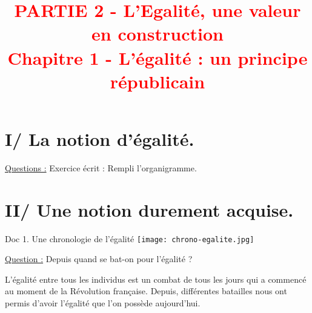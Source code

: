 \documentclass{beamer}
\title{{\textcolor{red}{PARTIE 2 - L'Egalité, une valeur en construction \\ Chapitre 1 - L'égalité : un principe républicain}}}
\begin{document}
 \begin{frame}
  \titlepage %
  \end{frame}
  
  \begin{frame}
  \tableofcontents
  \end{frame}
       
 
 
 
 
 
 \section{I/ La notion d'égalité.}
 
 \begin{frame}
 \underline{Questions :}
 Exercice écrit : Rempli l'organigramme.
 \end{frame}
 
 
 
 \section{II/ Une notion durement acquise.}
 \begin{frame}
 \begin{beamerboxesrounded}[scheme=blocimage]{Doc 1. Une chronologie de l'égalité} 
 \texttt{[image: chrono-egalite.jpg]}
 \end{beamerboxesrounded}
 
 
 \underline{Question :}
 Depuis quand se bat-on pour l'égalité ?
 \end{frame}
 
 \begin{frame}
 L'égalité entre tous les individus est un combat de tous les jours qui a commencé au moment de la Révolution française. Depuis, différentes batailles nous ont permis d'avoir l'égalité que l'on possède aujourd'hui.
 \end{frame}
 
 
 
\end{document}

